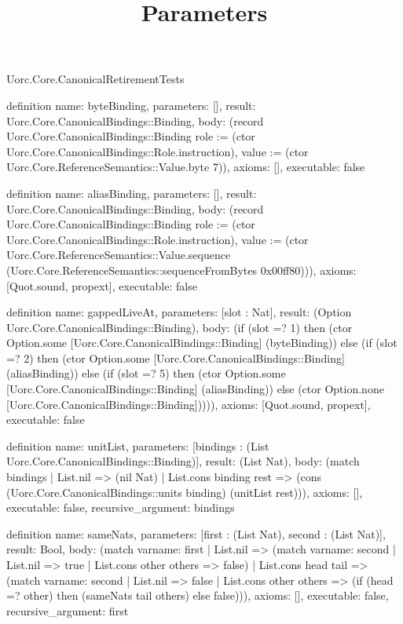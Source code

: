 \begin{lexlean}{Uorc.Core.CanonicalRetirementTests}
\title{Parameters}
\begin{semanticmodule}
definition{
  name: byteBinding,
  parameters: [],
  result: Uorc.Core.CanonicalBindings::Binding,
  body: (record Uorc.Core.CanonicalBindings::Binding {role := (ctor Uorc.Core.CanonicalBindings::Role.instruction), value := (ctor Uorc.Core.ReferenceSemantics::Value.byte 7)}),
  axioms: [],
  executable: false
}

definition{
  name: aliasBinding,
  parameters: [],
  result: Uorc.Core.CanonicalBindings::Binding,
  body: (record Uorc.Core.CanonicalBindings::Binding {role := (ctor Uorc.Core.CanonicalBindings::Role.instruction), value := (ctor Uorc.Core.ReferenceSemantics::Value.sequence (Uorc.Core.ReferenceSemantics::sequenceFromBytes 0x00ff80))}),
  axioms: [Quot.sound, propext],
  executable: false
}

definition{
  name: gappedLiveAt,
  parameters: [slot : Nat],
  result: (Option Uorc.Core.CanonicalBindings::Binding),
  body: (if (slot =? 1) then (ctor Option.some [Uorc.Core.CanonicalBindings::Binding] (byteBinding)) else (if (slot =? 2) then (ctor Option.some [Uorc.Core.CanonicalBindings::Binding] (aliasBinding)) else (if (slot =? 5) then (ctor Option.some [Uorc.Core.CanonicalBindings::Binding] (aliasBinding)) else (ctor Option.none [Uorc.Core.CanonicalBindings::Binding])))),
  axioms: [Quot.sound, propext],
  executable: false
}

definition{
  name: unitList,
  parameters: [bindings : (List Uorc.Core.CanonicalBindings::Binding)],
  result: (List Nat),
  body: (match bindings
    | List.nil => (nil Nat)
    | List.cons binding rest => (cons (Uorc.Core.CanonicalBindings::units binding) (unitList rest))),
  axioms: [],
  executable: false,
  recursive_argument: bindings
}

definition{
  name: sameNats,
  parameters: [first : (List Nat), second : (List Nat)],
  result: Bool,
  body: (match var{name: first}
    | List.nil => (match var{name: second} | List.nil => true | List.cons other others => false)
    | List.cons head tail => (match var{name: second}
      | List.nil => false
      | List.cons other others => (if (head =? other) then (sameNats tail others) else false))),
  axioms: [],
  executable: false,
  recursive_argument: first
}


\end{semanticmodule}
\end{lexlean}
